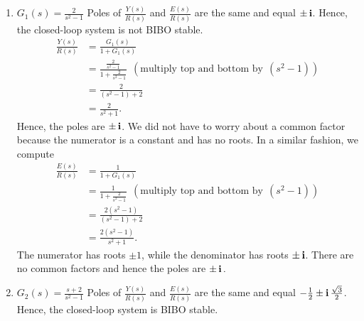  \begin{enumerate}
\renewcommand{\labelenumi}{(\alph{enumi})}
\setlength{\itemsep}{.2cm}
\item $G_1(s) = \frac{2}{s^2-1}$ \quad \Ans Poles of $\frac{Y(s)}{R(s)}$ and $\frac{E(s)}{R(s)}$ are the same and equal $\pm \mathop{\bm{\mathrm i}}$. Hence, the closed-loop system is not BIBO stable.\\

\begin{align*}
    \frac{Y(s)}{R(s)} & = \frac{G_1(s)}{1 + G_1(s)} \\
    & =  \frac{\frac{2}{s^2-1}}{1 + \frac{2}{s^2-1}}~~ (\text{multiply top and bottom by}~~(s^2-1))\\
    & = \frac{2}{(s^2-1) + 2} \\
    & = \frac{2}{s^2+1}.
\end{align*}
Hence, the poles are $\pm \mathop{\bm{\mathrm i}}$. We did not have to worry about a common factor because the numerator is a constant and has no roots. In a similar fashion, we compute
\begin{align*}
    \frac{E(s)}{R(s)} & = \frac{1}{1 + G_1(s)} \\
    & =  \frac{1}{1 + \frac{2}{s^2-1}}~~ (\text{multiply top and bottom by}~~(s^2-1))\\
    & = \frac{2(s^2-1)}{(s^2-1) + 2} \\
    & = \frac{2(s^2 - 1)}{s^2+1}.
\end{align*}
The numerator has roots $\pm 1$, while the denominator has roots $\pm \mathop{\bm{\mathrm i}}$. There are no common factors and hence the poles are $\pm \mathop{\bm{\mathrm i}}.$

\item $G_2(s) = \frac{s+2}{s^2-1}$ \quad \Ans Poles of $\frac{Y(s)}{R(s)}$ and $\frac{E(s)}{R(s)}$ are the same and equal $-\frac{1}{2} \pm \mathop{\bm{\mathrm i}} \frac{\sqrt{3}}{2}$. Hence, the closed-loop system is BIBO stable.\\


\end{enumerate}
